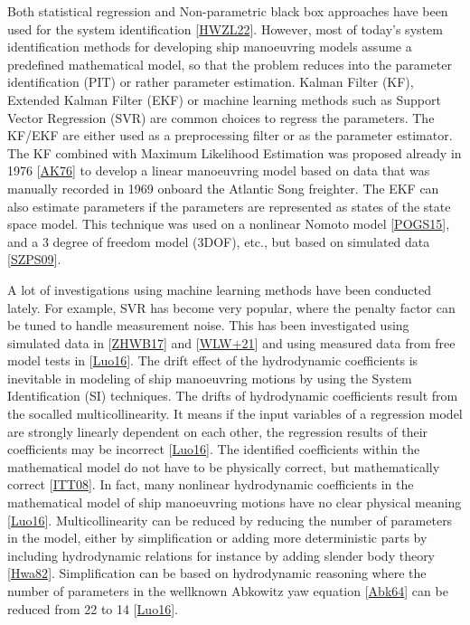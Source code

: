 \documentclass[review]{elsarticle}
\begin{document}
Both statistical regression and Non-parametric black box approaches have been used for the system identification {[}\hyperlink{cite.bibligraphy:id82}{HWZL22}{]}. However, most of today’s system identification methods for developing ship manoeuvring models assume a pre\sphinxhyphen{}defined mathematical model, so that the problem reduces into the parameter identification (PIT) or rather parameter estimation. Kalman Filter (KF), Extended Kalman Filter (EKF) or machine learning methods such as Support Vector Regression (SVR) are common choices to regress the parameters. The KF/EKF are either used as a pre\sphinxhyphen{}processing filter or as the parameter estimator. The KF combined with Maximum Likelihood Estimation was proposed already in 1976 {[}\hyperlink{cite.bibligraphy:id30}{AK76}{]} to develop a linear manoeuvring model based on data that was manually recorded in 1969 onboard the Atlantic Song freighter. The EKF can also estimate parameters if the parameters are represented as states of the state space model. This technique was used on a nonlinear Nomoto model {[}\hyperlink{cite.bibligraphy:id33}{POGS15}{]}, and a 3 degree of freedom model (3DOF), etc., but based on simulated data {[}\hyperlink{cite.bibligraphy:id54}{SZPS09}{]}.

A lot of investigations using machine learning methods have been conducted lately. For example, SVR has become very popular, where the penalty factor can be tuned to handle measurement noise. This has been investigated using simulated data in {[}\hyperlink{cite.bibligraphy:id38}{ZHWB17}{]} and {[}\hyperlink{cite.bibligraphy:id47}{WLW+21}{]} and using measured data from free model tests in {[}\hyperlink{cite.bibligraphy:id56}{Luo16}{]}.
The drift effect of the hydrodynamic coefficients is inevitable in modeling of ship manoeuvring motions by using the System Identification (SI) techniques. The drifts of hydrodynamic coefficients result from the so\sphinxhyphen{}called multicollinearity. It means if the input variables of a regression model are strongly linearly dependent on each other, the regression results of their coefficients may be incorrect {[}\hyperlink{cite.bibligraphy:id56}{Luo16}{]}. The identified coefficients within the mathematical model do not have to be physically correct, but mathematically correct {[}\hyperlink{cite.bibligraphy:id75}{ITT08}{]}. In fact, many nonlinear hydrodynamic coefficients in the mathematical model of ship manoeuvring motions have no clear physical meaning {[}\hyperlink{cite.bibligraphy:id56}{Luo16}{]}. Multicollinearity can be reduced by reducing the number of parameters in the model, either by simplification or adding more deterministic parts by including hydrodynamic relations for instance by adding slender body theory {[}\hyperlink{cite.bibligraphy:id80}{Hwa82}{]}. Simplification can be based on hydrodynamic reasoning where the number of parameters in the well\sphinxhyphen{}known Abkowitz yaw equation {[}\hyperlink{cite.bibligraphy:id25}{Abk64}{]} can be reduced from 22 to 14 {[}\hyperlink{cite.bibligraphy:id56}{Luo16}{]}.
\end{document}
